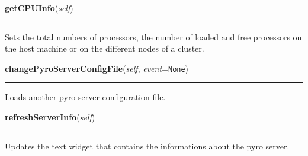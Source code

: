     \vspace{0.5ex}

\hspace{.8\funcindent}\begin{boxedminipage}{\funcwidth}

    \raggedright \textbf{getCPUInfo}(\textit{self})

    \vspace{-1.5ex}

    \rule{\textwidth}{0.5\fboxrule}
\setlength{\parskip}{2ex}
    Sets the total numbers of processors, the number of loaded and free 
    processors on the host machine or on the different nodes of a cluster.

\setlength{\parskip}{1ex}
    \end{boxedminipage}

    \label{nMOLDYN:GUI:PyroServerDialog:PyroServerDialog:changePyroServerConfigFile}

    \vspace{0.5ex}

\hspace{.8\funcindent}\begin{boxedminipage}{\funcwidth}

    \raggedright \textbf{changePyroServerConfigFile}(\textit{self}, \textit{event}={\tt None})

    \vspace{-1.5ex}

    \rule{\textwidth}{0.5\fboxrule}
\setlength{\parskip}{2ex}
    Loads another pyro server configuration file.

\setlength{\parskip}{1ex}
    \end{boxedminipage}

    \label{nMOLDYN:GUI:PyroServerDialog:PyroServerDialog:refreshServerInfo}

    \vspace{0.5ex}

\hspace{.8\funcindent}\begin{boxedminipage}{\funcwidth}

    \raggedright \textbf{refreshServerInfo}(\textit{self})

    \vspace{-1.5ex}

    \rule{\textwidth}{0.5\fboxrule}
\setlength{\parskip}{2ex}
    Updates the text widget that contains the informations about the pyro 
    server.

\setlength{\parskip}{1ex}
    \end{boxedminipage}


